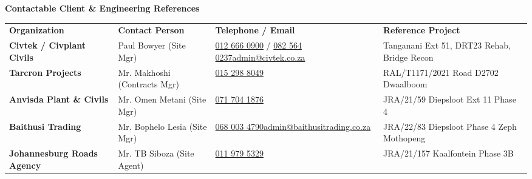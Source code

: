 \documentclass[a4paper,11pt]{article}
\begin{document}
\vfill

{\large\bfseries\color{mhnavy} Contactable Client \& Engineering References}
\vspace{0.12cm}

\renewcommand{\arraystretch}{1.28}
\begin{tabularx}{\textwidth}{@{}
    >{\raggedright\arraybackslash}p{3.5cm} 
    >{\raggedright\arraybackslash}p{3.1cm} 
    >{\raggedright\arraybackslash}p{4.2cm} 
    >{\raggedright\arraybackslash}X
@{}}
\rowcolor{mhnavy}
{\color{white}\bfseries\fontsize{8pt}{9.8pt}\selectfont Organization} &
{\color{white}\bfseries\fontsize{8pt}{9.8pt}\selectfont Contact Person} &
{\color{white}\bfseries\fontsize{8pt}{9.8pt}\selectfont Telephone / Email} &
{\color{white}\bfseries\fontsize{8pt}{9.8pt}\selectfont Reference Project} \\
\rowcolor{mhbluelight}
\fontsize{7.6pt}{9.4pt}\selectfont\bfseries Civtek / Civplant Civils & \fontsize{7.6pt}{9.4pt}\selectfont Paul Bowyer (Site Mgr) & \fontsize{7.6pt}{9.4pt}\selectfont \href{tel:0126660900}{012 666 0900} / \href{tel:0825640237}{082 564 0237}\newline\href{mailto:admin@civtek.co.za}{admin@civtek.co.za} & \fontsize{7.6pt}{9.4pt}\selectfont Tanganani Ext 51, DRT23 Rehab, Bridge Recon \\
\fontsize{7.6pt}{9.4pt}\selectfont\bfseries Tarcron Projects & \fontsize{7.6pt}{9.4pt}\selectfont Mr. Makhoshi (Contracts Mgr) & \fontsize{7.6pt}{9.4pt}\selectfont \href{tel:0152988049}{015 298 8049} & \fontsize{7.6pt}{9.4pt}\selectfont RAL/T1171/2021 Road D2702 Dwaalboom \\
\rowcolor{mhbluelight}
\fontsize{7.6pt}{9.4pt}\selectfont\bfseries Anvisda Plant \& Civils & \fontsize{7.6pt}{9.4pt}\selectfont Mr. Omen Metani (Site Mgr) & \fontsize{7.6pt}{9.4pt}\selectfont \href{tel:0717041876}{071 704 1876} & \fontsize{7.6pt}{9.4pt}\selectfont JRA/21/59 Diepsloot Ext 11 Phase 4 \\
\fontsize{7.6pt}{9.4pt}\selectfont\bfseries Baithusi Trading & \fontsize{7.6pt}{9.4pt}\selectfont Mr. Bophelo Lesia (Site Mgr) & \fontsize{7.6pt}{9.4pt}\selectfont \href{tel:0680034790}{068 003 4790}\newline\href{mailto:admin@baithusitrading.co.za}{admin@baithusitrading.co.za} & \fontsize{7.6pt}{9.4pt}\selectfont JRA/22/83 Diepsloot Phase 4 Zeph Mothopeng \\
\rowcolor{mhbluelight}
\fontsize{7.6pt}{9.4pt}\selectfont\bfseries Johannesburg Roads Agency & \fontsize{7.6pt}{9.4pt}\selectfont Mr. TB Siboza (Site Agent) & \fontsize{7.6pt}{9.4pt}\selectfont \href{tel:0119795329}{011 979 5329} & \fontsize{7.6pt}{9.4pt}\selectfont JRA/21/157 Kaalfontein Phase 3B \\

\end{tabularx}
\end{document}
